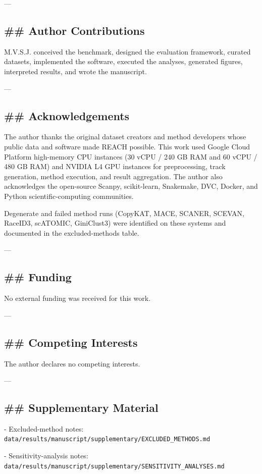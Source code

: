 \documentclass[11pt]{article}
\begin{document}
---

\subsection*{\#\# Author Contributions}
M.V.S.J. conceived the benchmark, designed the evaluation framework, curated datasets, implemented the software, executed the analyses, generated figures, interpreted results, and wrote the manuscript.

---

\subsection*{\#\# Acknowledgements}
The author thanks the original dataset creators and method developers whose public data and software made REACH possible. This work used Google Cloud Platform high-memory CPU instances (30 vCPU / 240 GB RAM and 60 vCPU / 480 GB RAM) and NVIDIA L4 GPU instances for preprocessing, track generation, method execution, and result aggregation. The author also acknowledges the open-source Scanpy, scikit-learn, Snakemake, DVC, Docker, and Python scientific-computing communities.

Degenerate and failed method runs (CopyKAT, MACE, SCANER, SCEVAN, RaceID3, scATOMIC, GiniClust3) were identified on these systems and documented in the excluded-methods table.

---

\subsection*{\#\# Funding}
No external funding was received for this work.

---

\subsection*{\#\# Competing Interests}
The author declares no competing interests.

---

\subsection*{\#\# Supplementary Material}
- Excluded-method notes: \texttt{data/results/manuscript/supplementary/EXCLUDED\_METHODS.md}

- Sensitivity-analysis notes: \texttt{data/results/manuscript/supplementary/SENSITIVITY\_ANALYSES.md}
\end{document}
